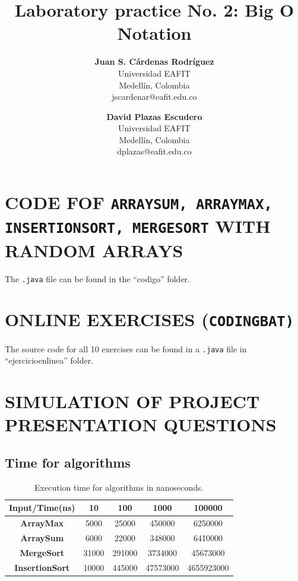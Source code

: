 \documentclass[a4paper,12pt]{article}
\title{\color{Eblue}\textbf{Laboratory practice No. 2: Big O Notation}}
\author{
  \textbf{Juan S. Cárdenas Rodríguez}\\
  Universidad EAFIT\\
  Medellín, Colombia\\
  jscardenar@eafit.edu.co
\and
  \textbf{David Plazas Escudero}\\
  Universidad EAFIT\\
  Medellín, Colombia\\
  dplazas@eafit.edu.co
}
\begin{document}
  \maketitle
  \thispagestyle{fancy}

  \section{CODE FOF \texttt{ARRAYSUM, ARRAYMAX, INSERTIONSORT, MERGESORT} WITH RANDOM ARRAYS}
    The \texttt{.java} file can be found in the ``codigo'' folder.
  \section{ONLINE EXERCISES (\texttt{CODINGBAT)}}
    The source code for all 10 exercises can be found in a \texttt{.java} file in ``ejercicioenlinea'' folder.
  \section{SIMULATION OF PROJECT PRESENTATION QUESTIONS}
    \subsection{Time for algorithms}
    \begin{table}[H]
      \centering
      \caption{Execution time for algorithms in nanoseconds.}
      \label{my-label}
      \begin{tabular}{ccccc}
        \hline
        \textbf{Input/Time(ns)} & \textbf{10} & \textbf{100} & \textbf{1000} & \textbf{100000} \\ \hline
        \textbf{ArrayMax}       & 5000        & 25000        & 450000        & 6250000         \\
        \textbf{ArraySum}       & 6000        & 22000        & 348000        & 6410000         \\
        \textbf{MergeSort}      & 31000       & 291000       & 3734000       & 45673000        \\
        \textbf{InsertionSort}  & 10000       & 445000       & 47573000      & 4655923000      \\ \hline
      \end{tabular}
    \end{table}
\end{document}
